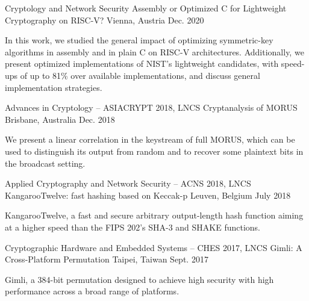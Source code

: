 \begin{cventries}
	\cventry
	{Cryptology and Network Security}
	{Assembly or Optimized C for Lightweight Cryptography on RISC-V?} %
	{Vienna, Austria} %
	{Dec. 2020} %
	{
		\begin{cvitems} %
			\item {In this work, we studied the general impact of optimizing symmetric-key algorithms in assembly and in plain C on RISC-V architectures. Additionally, we present optimized implementations of NIST's lightweight candidates, with speed-ups of up to 81\% over available implementations, and discuss general implementation strategies.}
		\end{cvitems}
	}

	\vspace{1em}
	\cventry
	{Advances in Cryptology – ASIACRYPT 2018, LNCS}
	{Cryptanalysis of MORUS} %
	{Brisbane, Australia} %
	{Dec. 2018} %
	{
		\begin{cvitems} %
			\item {We present a linear correlation in the keystream of full MORUS, which can be used to distinguish its output from random and to recover some plaintext bits in the broadcast setting.}
		\end{cvitems}
	}

	\cventry
	{Applied Cryptography and Network Security – ACNS 2018, LNCS}
	{KangarooTwelve: fast hashing based on Keccak-p} %
	{Leuven, Belgium} %
	{July 2018} %
	{
		\begin{cvitems} %
			\item {KangarooTwelve, a fast and secure arbitrary output-length hash function aiming at a higher speed than the FIPS 202’s SHA-3 and SHAKE functions.}
		\end{cvitems}
	}

	\cventry
	{Cryptographic Hardware and Embedded Systems – CHES 2017, LNCS}
	{Gimli: A Cross-Platform Permutation} %
	{Taipei, Taiwan} %
	{Sept. 2017} %
	{
		\begin{cvitems} %
			\item {Gimli, a 384-bit permutation designed to achieve high security with high performance across a broad range of platforms.}
		\end{cvitems}
	}


\end{cventries}
